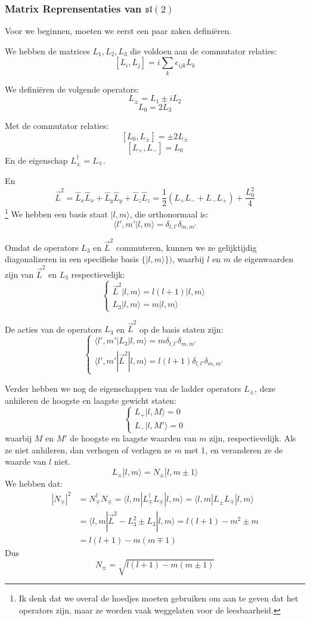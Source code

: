 \subsubsection{Matrix Reprensentaties van \(\mathfrak{sl}(2)\)}

Voor we beginnen, moeten we eerst een paar zaken definiëren.

We hebben de matrices \(L_1, L_2, L_3\) die voldoen aan de commutator relaties:
\[[L_i,L_j] = i \sum_k \epsilon_{ijk}L_k\]

We definiëren de volgende operators:
\[L_\pm = L_1 \pm i L_2\]
\[L_0 = 2L_3\]

Met de commutator relaties:
\[[L_0, L_\pm] = \pm 2 L_\pm\]
\[[L_+, L_-] = L_0\]
En de eigenschap \(L_\pm^\dagger = L_\mp\).

En 
\[\vec{L}^2 = \hat{L}_x \hat{L}_x + \hat{L}_y \hat{L}_y + \hat{L}_z \hat{L}_z = \frac{1}{2}(L_+ L_- + L_- L_+) + \frac{L_0^2}{4}\]
\footnote{Ik denk dat we overal de hoedjes moeten gebruiken om aan te geven dat het operators zijn, maar ze worden vaak weggelaten voor de leesbaarheid.}
We hebben een basis staat \(|l,m \rangle\), die orthonormaal is:
\[\langle l',m' | l,m \rangle = \delta_{l,l'} \delta_{m,m'}\]

Omdat de operators \(L_3\) en \(\vec{L}^2\) commuteren, kunnen we ze gelijktijdig diagonalizeren in een specifieke basis \(\{|l,m \rangle\})\),
waarbij \(l\) en \(m\) de eigenwaarden zijn van \(\vec{L}^2\) en \(L_3\) respectievelijk:
\[
\begin{cases}
\vec{L}^2 |l,m \rangle = l(l+1) |l,m \rangle \\
L_3 |l,m \rangle = m |l,m \rangle
\end{cases}
\]

De acties van de operators \(L_3\) en \(\vec{L}^2\) op de basis staten zijn:
\[
\begin{cases}
\langle l',m'| L_3 |l,m \rangle = m \delta_{l,l'} \delta_{m,m'} \\
\langle l',m'| \vec{L}^2 |l,m \rangle = l(l+1) \delta_{l,l'} \delta_{m,m'}
\end{cases}
\]

Verder hebben we nog de eigenschappen van de ladder operators \(L_\pm\), deze anhileren de hoogste en laagste gewicht staten:
\[
\begin{cases}
L_+ |l,M \rangle = 0 \\
L_- |l,M' \rangle = 0
\end{cases}
\]
waarbij \(M\) en \(M'\) de hoogste en laagste waarden van \(m\) zijn, respectievelijk.
Als ze niet anhileren, dan verhogen of verlagen ze \(m\) met 1, en veranderen ze de waarde van \(l\) niet.
\[L_\pm |l,m \rangle = N_\pm | l , m \pm 1 \rangle\]
We hebben dat:
\begin{align*}
    |N_\mp|^2
    &= N_\mp^\dagger N_\mp 
    = \langle l,m | L_\mp^\dagger L_\mp | l,m \rangle 
    = \langle l,m | L_\pm L_\mp | l,m \rangle \\
    &= \langle l,m | \vec{L}^2 - L_3^2 \pm L_3 | l,m \rangle 
    = l(l+1) - m^2 \pm m \\
    &= l(l+1) - m(m \mp 1)
\end{align*}
Dus 
\[ N_\pm = \sqrt{l(l+1) - m(m \pm 1)} \]

